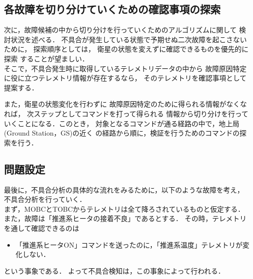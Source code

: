 \documentclass[11pt]{article}
\begin{document}

\subsection{各故障を切り分けていくための確認事項の探索}
次に，故障候補の中から切り分けを行っていくためのアルゴリズムに関して
検討状況を述べる．
不具合が発生している状態で予期せぬ二次故障を起こさないために，
探索順序としては，
衛星の状態を変えずに確認できるものを優先的に探索
することが望ましい．\\
そこで，不具合発生時に取得しているテレメトリデータの中から
故障原因特定に役に立つテレメトリ情報が存在するなら，
そのテレメトリを確認事項として提案する．

また，衛星の状態変化を行わずに
故障原因特定のために得られる情報がなくなれば，
次ステップとしてコマンドを打って得られる
情報から切り分けを行っていくことになる．このとき，
対象となるコマンドが通る経路の中で，地上局(Ground Station，GS)の近く
の経路から順に，検証を行うためのコマンドの探索を行う．

\subsection{問題設定}
最後に，不具合分析の具体的な流れをみるために，以下のような故障を考え，
不具合分析を行っていく．\\
まず，MOBCとTOBCからテレメトリは全て降ろされているものと仮定する．
また，故障は「推進系ヒータの接着不良」であるとする．
その時，テレメトリを通して確認できるのは
\begin{itemize}
   \item 「推進系ヒータON」コマンドを送ったのに，「推進系温度」テレメトリが変化しない．
\end{itemize}
という事象である．
よって不具合検知は，この事象によって行われる．
\end{document}
